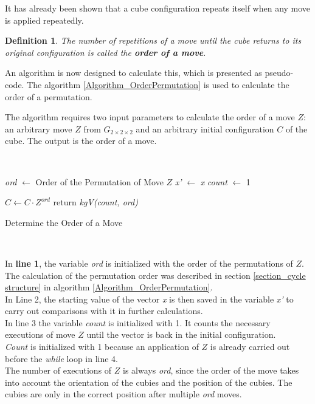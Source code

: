 \documentclass[12pt,a4paper]{article}
\theoremstyle{custom}
\newtheorem*{definition}{Definition}
\newcommand{\Gtwo}{\ensuremath{G_{2\times 2\times 2}}}
\begin{document}
It has already been shown that a cube configuration repeats itself when any move is applied repeatedly. 
\begin{definition}
    The number of repetitions of a move until the cube returns to its original configuration is called the \textbf{order of a move}.
\end{definition}
An algorithm is now designed to calculate this, which is presented as pseudo-code. The algorithm \ref{Algorithm_OrderPermutation} is used to calculate the order of a permutation.

The algorithm requires two input parameters to calculate the order of a move $Z$: an arbitrary move $Z$ from $\Gtwo$ and an arbitrary initial configuration $C$ of the cube. The output is the order of a move.

\begin{minipage}[H]{0.15\textwidth}
      $\ $
\end{minipage}
\begin{minipage}[H]{0.65\textwidth}
\begin{algorithm}[H]
\LinesNumbered
\DontPrintSemicolon
{}

 \textit{ord} $\leftarrow$ Order of the Permutation of Move $Z$\;
  \textit{x'} $\leftarrow$ \textit{x}\;
  \textit{count} $\leftarrow$ 1\;

  $C \leftarrow C \cdot  Z^\textit{ord}$ \; 
 return \textit{kgV(count, ord)} \;

\caption{Determine the Order of a Move} 
\label{Algorithm_OrderMove}
\end{algorithm}
\end{minipage}
\begin{minipage}[H]{0.2\textwidth}
      $\ $
\end{minipage}

\vspace*{1em}


In \textbf{line 1}, the variable \textit{ord} is initialized with the order of the permutations of $Z$. 
The calculation of the permutation order was described in section \ref{section_cycle structure} in algorithm \ref{Algorithm_OrderPermutation}. \\
In Line 2, the starting value of the vector \textit{x} is then saved in the variable \textit{x'} to carry out comparisons with it in further calculations. \\
In line 3 the variable \textit{count} is initialized with 1. It counts the necessary executions of move $Z$ until the vector is back in the initial configuration. \\ \textit{Count} is initialized with 1 because an application of $Z$ is already carried out before the \textit{while} loop in line 4. 
\\ 
The number of executions of $Z$ is always \textit{ord}, since the order of the move takes into account the orientation of the cubies and the position of the cubies. The cubies are only in the correct position after multiple \textit{ord} moves.
\end{document}
